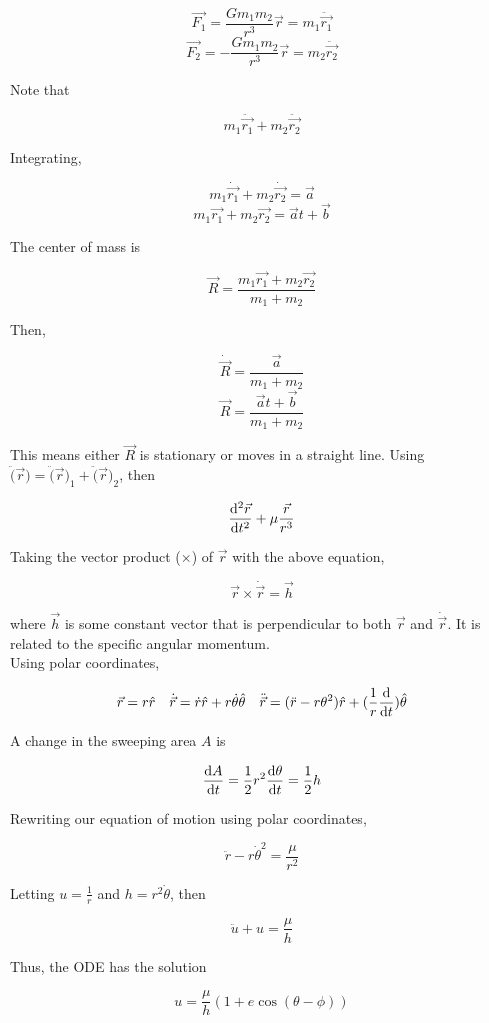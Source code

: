 \documentclass[]{article}
\begin{document}
\[\vec{F_1} = \frac{Gm_1 m_2}{r^3}\vec{r} = m_1\ddot{\vec{r_1}}\]
\[\vec{F_2} = -\frac{Gm_1 m_2}{r^3}\vec{r} = m_2\ddot{\vec{r_2}}\]

Note that 

\[m_1\ddot{\vec{r_1}} + m_2\ddot{\vec{r_2}}\]


Integrating,

\[m_1\dot{\vec{r_1}} + m_2\dot{\vec{r_2}} = \vec{a}\]
\[m_1\vec{r_1} + m_2\vec{r_2} = \vec{a}t + \vec{b}\]

The center of mass is 

\[\vec{R} = \frac{m_1\vec{r_1}+m_2\vec{r_2}}{m_1+m_2}\]

Then, 

\[\dot{\vec{R}} = \frac{\vec{a}}{m_1+m_2}\]
\[\vec{R} = \frac{\vec{a}t + \vec{b}}{m_1+m_2}\]


This means either $\vec{R}$ is stationary or moves in a straight line. Using $\ddot(\vec{r}) = \ddot(\vec{r})_1 + \ddot(\vec{r})_2$, then

\[\dv[2]{\vec{r}}{t} + \mu \frac{\vec{r}}{r^3}\]

Taking the vector product ($\times$) of $\vec{r}$ with the above equation, 

\[\vec{r}\times \dot{\vec{r}} = \vec{h}\]

where $\vec{h}$ is some constant vector that is perpendicular to both $\vec{r}$ and $\dot{\vec{r}}$. It is related to the specific angular momentum.\\

Using polar coordinates, 

\[\vec{r} = r\hat{r} \quad \dot{\vec{r}} = \dot{r}\hat{r} + r\dot{\theta}\hat{\theta} \quad \ddot{\vec{r}} = (\ddot{r} - r\theta^2)\hat{r} + (\frac{1}{r}\dv{}{t}(r^2\theta))\hat{\theta}\]


A change in the sweeping area $A$ is 

\[\dv{A}{t} = \frac{1}{2}r^2 \dv{\theta}{t} = \frac{1}{2}h\]

Rewriting our equation of motion using polar coordinates,

\[\ddot{r} - r\dot{\theta}^2 = \frac{\mu}{r^2}\]

Letting $u =\frac{1}{r}$ and $h=r^2\dot{\theta}$, then

\[\ddot{u} + u = \frac{\mu}{h}\]

Thus, the ODE has the solution 

\[u = \frac{\mu}{h}(1+e\cos(\theta - \phi))\]
\end{document}
